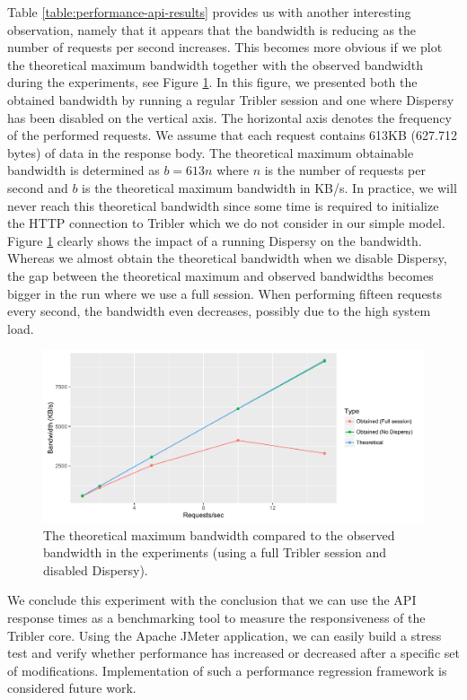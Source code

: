 Table \ref{table:performance-api-results} provides us with another interesting observation, namely that it appears that the bandwidth is reducing as the number of requests per second increases. This becomes more obvious if we plot the theoretical maximum bandwidth together with the observed bandwidth during the experiments, see Figure \ref{fig:api-bandwidth-performance}. In this figure, we presented both the obtained bandwidth by running a regular Tribler session and one where Dispersy has been disabled on the vertical axis. The horizontal axis denotes the frequency of the performed requests. We assume that each request contains 613KB (627.712 bytes) of data in the response body. The theoretical maximum obtainable bandwidth is determined as $ b = 613n $ where $ n $ is the number of requests per second and $ b $ is the theoretical maximum bandwidth in KB/s. In practice, we will never reach this theoretical bandwidth since some time is required to initialize the HTTP connection to Tribler which we do not consider in our simple model. Figure \ref{fig:api-bandwidth-performance} clearly shows the impact of a running Dispersy on the bandwidth. Whereas we almost obtain the theoretical bandwidth when we disable Dispersy, the gap between the theoretical maximum and observed bandwidths becomes bigger in the run where we use a full session. When performing fifteen requests every second, the bandwidth even decreases, possibly due to the high system load.\\

\begin{figure}[h!]
	\centering
	\includegraphics[width=1.0\columnwidth]{images/experiments/api_bandwidth_performance}
	\caption{The theoretical maximum bandwidth compared to the observed bandwidth in the experiments (using a full Tribler session and disabled Dispersy).}
	\label{fig:api-bandwidth-performance}
\end{figure}

\noindent We conclude this experiment with the conclusion that we can use the API response times as a benchmarking tool to measure the responsiveness of the Tribler core. Using the Apache JMeter application, we can easily build a stress test and verify whether performance has increased or decreased after a specific set of modifications. Implementation of such a performance regression framework is considered future work. 

